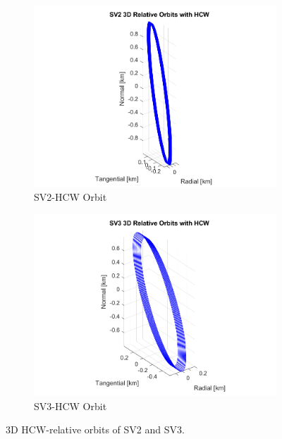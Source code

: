 \begin{figure}[htpb]
    \centering
    \begin{subfigure}[t]{0.45\linewidth}
        \centering
        \includegraphics[width=1.2\linewidth]{sim/figures/PS3/3D_HCW_orbit_SV2.png}
        \caption{SV2-HCW Orbit}
        \label{fig:hcw_sv2}
    \end{subfigure}%
    \begin{subfigure}[t]{0.45\linewidth}
        \centering
        \includegraphics[width=1.2\linewidth]{sim/figures/PS3/3D_HCW_orbit_SV3.png}
        \caption{SV3-HCW Orbit}
        \label{fig:hcw_sv3}
    \end{subfigure}
    \caption{3D HCW-relative orbits of SV2 and SV3.}
    \label{fig:hcw_3d_side_by_side}
\end{figure}

